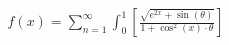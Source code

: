 \documentclass[preview]{standalone}
\begin{document}
\begin{align*}
f(x) = \sum_{n=1}^{\infty} \int_{0}^{1} \left[ \frac{\sqrt{e^{2x} + \sin(\theta)} }{1 + \cos^2(x) \cdot \theta} \right]
\end{align*}
\end{document}
